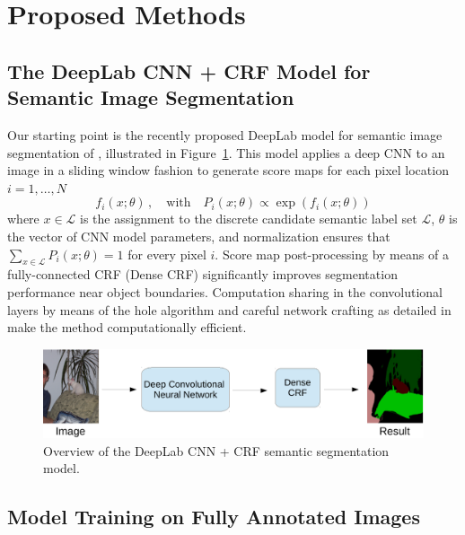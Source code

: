 \section{Proposed Methods}

\subsection{The DeepLab CNN + CRF Model for Semantic Image Segmentation}

Our starting point is the recently proposed DeepLab model for semantic
image segmentation of \citet{chen2014semantic}, illustrated in
Figure~\ref{fig:model_test}. This model applies a deep CNN to an image
in a sliding window fashion to generate score maps for each pixel
location $i = 1, \dots, N$
\begin{equation}
  \label{eq:scores}
  f_i(x; \theta) \,,
  \quad \mathrm{with} \quad
  P_i(x; \theta) \propto \exp \left( f_i(x; \theta) \right)
\end{equation}
where $x \in \mathcal{L}$ is the assignment to the discrete candidate
semantic label set $\mathcal{L}$, $\theta$ is the vector of CNN model
parameters, and normalization ensures that $\sum_{x \in  \mathcal{L}}
P_i(x; \theta) = 1$ for every pixel $i$. Score map post-processing by
means of a fully-connected CRF (Dense CRF)
\cite{krahenbuhl2011efficient} significantly improves segmentation
performance near object boundaries. Computation sharing in the
convolutional layers by means of the hole algorithm and careful
network crafting as detailed in \citet{chen2014semantic} make the
method computationally efficient.

\begin{figure}[htbp!]
  \centering
  \includegraphics[width=0.9\linewidth]{fig/model_test.pdf} 
  \caption{Overview of the DeepLab CNN + CRF semantic segmentation model.}
  \label{fig:model_test}
\end{figure}

\subsection{Model Training on Fully Annotated Images}
\label{sec:train_pixel}

